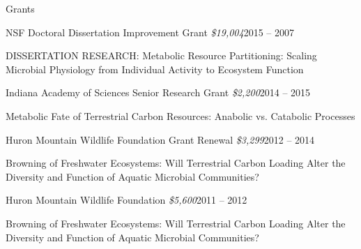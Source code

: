 \documentclass{resume} %
\begin{document}

\begin{rSection}{Grants}

    \begin{rSubsection}{NSF Doctoral Dissertation Improvement Grant
      {\normalfont \em \$19,004}}{2015 -- 2007}{}{}
      \item DISSERTATION RESEARCH: Metabolic Resource Partitioning: Scaling
      Microbial Physiology from Individual Activity to Ecosystem Function
    \end{rSubsection}

    \begin{rSubsection}{Indiana Academy of Sciences Senior Research Grant
      {\normalfont \em \$2,200}}{2014 -- 2015}{}{}
      \item Metabolic Fate of Terrestrial Carbon Resources: Anabolic vs.
      Catabolic Processes
    \end{rSubsection}

    \begin{rSubsection}{Huron Mountain Wildlife Foundation Grant Renewal
      {\normalfont \em \$3,299}}{2012 -- 2014}{}{}
      \item Browning of Freshwater Ecosystems: Will Terrestrial Carbon Loading
      Alter the Diversity and Function of Aquatic Microbial Communities?
    \end{rSubsection}

    \begin{rSubsection}{Huron Mountain Wildlife Foundation
      {\normalfont \em \$5,600}}{2011 -- 2012}{}{}
      \item Browning of Freshwater Ecosystems: Will Terrestrial Carbon Loading
      Alter the Diversity and Function of Aquatic Microbial Communities?
    \end{rSubsection}

\end{rSection}

\end{document}
